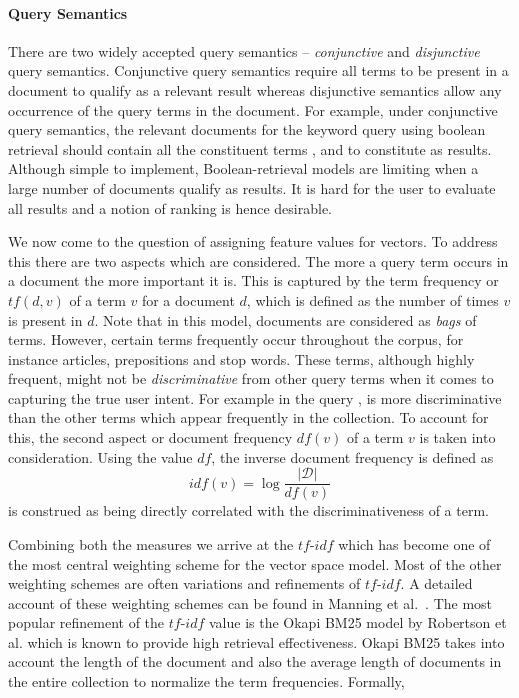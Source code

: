 \paragraph{Query Semantics} There are two widely accepted query semantics -- \emph{conjunctive} and \emph{disjunctive} query semantics. Conjunctive query semantics require all terms to be present in a document to qualify as a relevant result whereas disjunctive semantics allow any occurrence of the query terms in the document. For example, under conjunctive query semantics, the relevant documents for the keyword query  using boolean retrieval should contain all the constituent terms ,  and  to constitute as results. Although simple to implement, Boolean-retrieval models are limiting when a large number of documents qualify as results. It is hard for the user to evaluate all results and a notion of ranking is hence desirable.

We now come to the question of assigning feature values for vectors. To address this there are two aspects which are considered. The more a query term occurs in a document the more important it is. This is captured by the term frequency or $tf(d,v)$ of a term $v$ for a document $d$, which is defined as the number of times $v$ is present in $d$. Note that in this model, documents are considered as \emph{bags} of terms. However, certain terms frequently occur throughout the corpus, for instance articles, prepositions and stop words. These terms, although highly frequent, might not be \emph{discriminative} from other query terms when it comes to capturing the true user intent. For example in the query ,  is more discriminative than the other terms which appear frequently in the collection. To account for this, the second aspect or document frequency $df(v)$ of a term $v$ is taken into consideration. Using the value $df$, the inverse document frequency is defined as 
$$ idf(v) =  \log \frac{|\mathcal{D}|}{df(v)}$$
is construed as being directly correlated with the discriminativeness of a term.

Combining both the measures we arrive at the $tf$-$idf$ which has become one of the most central weighting scheme for the vector space model. Most of the other weighting schemes are often variations and refinements of $tf$-$idf$. A detailed account of these weighting schemes can be found in Manning et al.~\cite{Manning:2008fk}. The most popular refinement of the $tf$-$idf$ value is the Okapi BM25 model by Robertson et al. which is known to provide high retrieval effectiveness. Okapi BM25 takes into account the length of the document and also the average length of documents in the entire collection to normalize the term frequencies. Formally,

